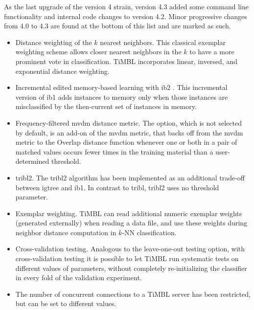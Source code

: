 \documentclass{report}
\begin{document}
As the last upgrade of the version 4 strain, version 4.3 added some
command line functionality and internal code changes to version
4.2. Minor progressive changes from 4.0 to 4.3 are found at the bottom
of this list and are marked as such.

\begin{itemize}

\item Distance weighting of the $k$ nearest neighbors. This classical
exemplar weighting scheme \cite{Dudani76} allows closer nearest
neighbors in the $k$ to have a more prominent vote in
classification. TiMBL incorporates linear, inversed, and exponential
distance weighting.

\item Incremental edited memory-based learning with {\sc ib2}
\cite{Aha+91}. This incremental version of {\sc ib1} adds instances to
memory only when those instances are misclassified by the then-current
set of instances in memory.

\item Frequency-filtered {\sc mvdm} distance metric. The option, which is
not selected by default, is an add-on of the {\sc mvdm} metric, that backs
off from the {\sc mvdm} metric to the Overlap distance function whenever one
or both in a pair of matched values occurs fewer times in the training
material than a user-determined threshold.

\item {\sc tribl2}. The {\sc tribl2} algorithm has been implemented
as an additional trade-off between {\sc igtree} and {\sc ib1}. In
contrast to {\sc tribl}, {\sc tribl2} uses no threshold parameter.

\item Exemplar weighting. TiMBL can read additional numeric exemplar
weights (generated externally) when reading a data file, and use these
weights during neighbor distance computation in $k$-NN classification.

\item Cross-validation testing. Analogous to the leave-one-out testing
option, with cross-validation testing it is possible to let TiMBL run
systematic tests on different values of parameters, without completely
re-initializing the classifier in every fold of the validation experiment.

\item The number of concurrent connections to a TiMBL server has been
restricted, but can be set to different values.


\end{itemize}
\end{document}
